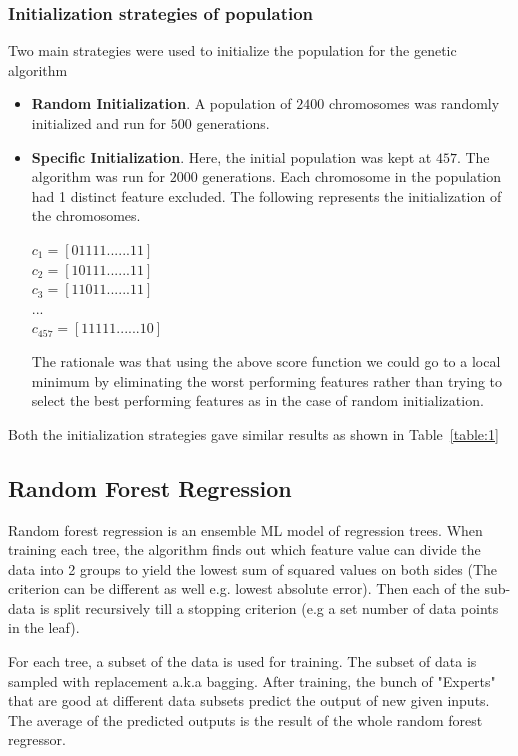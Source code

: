\documentclass[11pt]{article}
\begin{document}
\subsubsection{Initialization strategies of population}
Two main strategies were used to initialize the population for the genetic algorithm
\begin{itemize}
\item \textbf{Random Initialization}.  A population of $2400$ chromosomes was randomly initialized and run for $500$ generations.
\item \textbf{Specific Initialization}.  Here,  the initial population was kept at $457$.
The algorithm was run for $2000$ generations.
Each chromosome in the population had 1 distinct feature excluded.  The following represents the initialization of the chromosomes.

$
c_1 = [0 1 1 1 1 ......  1 1]
$ \\
$
c_2 = [1 0 1 1 1 ......  1 1]
$ \\
$
c_3 = [1 1 0 1 1 ......  1 1]
$ \\
$
... 
$ \\
$
c_{457} = [1 1 1 1 1 ......  1 0]
$

The rationale was that using the above score function we could go to a local minimum by eliminating the worst performing features rather than trying to select the best performing features as in the case of random initialization.
\end{itemize}

Both the initialization strategies gave similar results as shown in Table~\ref{table:1}

\subsection{Random Forest Regression}
Random forest regression is an ensemble ML model of regression trees.
When training each tree,  the algorithm finds out which feature value can divide the data into 2 groups to yield the lowest sum of squared values on both sides (The criterion can be different as well e.g. lowest absolute error).
Then each of the sub-data is split recursively till a stopping criterion (e.g a set number of data points in the leaf).

For each tree,  a subset of the data is used for training. 
The subset of data is sampled with replacement a.k.a bagging.
After training,  the bunch of "Experts" that are good at different data subsets predict the output of new given inputs.
The average of the predicted outputs is the result of the whole random forest regressor.
\end{document}
